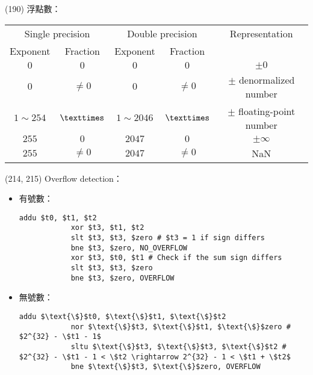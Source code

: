\item \begin{theorem}{(190)} 浮點數：
    \begin{table}[H]
        \centering
        \begin{tabular}{|c|c|c|c|c|}
            \hline
            \multicolumn{2}{|c|}{Single precision} & \multicolumn{2}{c|}{Double precision} & Representation \\
            \Xhline{2\arrayrulewidth}
            Exponent & Fraction & Exponent & Fraction & \\
            \hline
            $0$ & $0$ & $0$ & $0$ & $\pm 0$ \\
            \hline
            $0$ & $\neq 0$ & $0$ & $\neq 0$ & $\pm$ denormalized number \\
            \hline
            $1 \sim 254$ & $\texttimes$ & $1 \sim 2046$ & $\texttimes$ & $\pm$ floating-point number \\
            \hline
            $255$ & $0$ & $2047$ & $0$ & $\pm \infty$ \\
            \hline
            $255$ & $\neq 0$ & $2047$ & $\neq 0$ & NaN \\
            \hline
        \end{tabular}
    \end{table}
\end{theorem}

\item \begin{theorem}{(214, 215)} Overflow detection： \begin{itemize}
        \item 有號數：\begin{lstlisting}[language={[x86masm]Assembler}]
            addu $t0, $t1, $t2
            xor $t3, $t1, $t2 
            slt $t3, $t3, $zero # $t3 = 1 if sign differs
            bne $t3, $zero, NO_OVERFLOW
            xor $t3, $t0, $t1 # Check if the sum sign differs
            slt $t3, $t3, $zero
            bne $t3, $zero, OVERFLOW
        \end{lstlisting}
        \item 無號數：\begin{lstlisting}[language={[x86masm]Assembler}, mathescape=true]
            addu $\text{\$}$t0, $\text{\$}$t1, $\text{\$}$t2
            nor $\text{\$}$t3, $\text{\$}$t1, $\text{\$}$zero # $2^{32} - \$t1 - 1$
            sltu $\text{\$}$t3, $\text{\$}$t3, $\text{\$}$t2 # $2^{32} - \$t1 - 1 < \$t2 \rightarrow 2^{32} - 1 < \$t1 + \$t2$
            bne $\text{\$}$t3, $\text{\$}$zero, OVERFLOW
    \end{lstlisting}
    \end{itemize}
\end{theorem}
